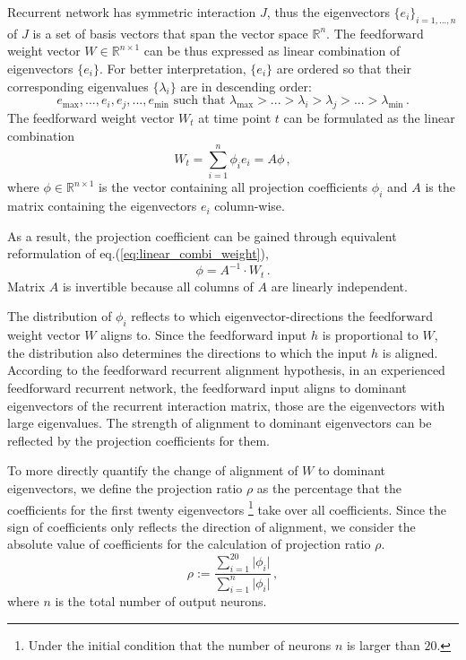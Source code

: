 \documentclass[11pt]{article}
\begin{document}
{	Recurrent network has symmetric interaction $J$, thus the eigenvectors $\{e_i\}_{i = 1, ..., n}$ of $J$ is a set of basis vectors that span the vector space $\mathbb{R}^n$. The feedforward weight vector $W \in \mathbb{R}^{n \times 1}$ can be thus expressed as linear combination of eigenvectors $\{e_i\}$. For better interpretation, $\{e_i\}$ are ordered so that their corresponding eigenvalues $\{\lambda_i\}$ are in descending order:
		\begin{equation}
			e_{\text{max}}, ..., e_i, e_j, ..., e_{\text{min}} \, \, \text{such that} \, \, \lambda_{\text{max}} > ...> \lambda_i > \lambda_j > ... > \lambda_{\text{min}} \, .
		\end{equation} 
	The feedforward weight vector $W_t$ at time point $t$ can be formulated as the linear combination
		\begin{equation} \label{eq:linear_combi_weight}
			W_t = \sum_{i = 1}^{n} \phi_i e_i = A \phi \, ,
		\end{equation}
	where $\phi \in \mathbb{R}^{n \times 1}$ is the vector containing all projection coefficients $\phi_i$ and $A$ is the matrix containing the eigenvectors $e_i$ column-wise.  
	
	As a result, the projection coefficient can be gained through equivalent reformulation of eq.(\ref{eq:linear_combi_weight}), 
		\begin{equation} \label{eq:calculation_ratio}
			\phi = A^{-1} \cdot W_t \, .
		\end{equation}
	Matrix $A$ is invertible because all columns of $A$ are linearly independent. 
	
	The distribution of $\phi_i$ reflects to which eigenvector-directions the feedforward weight vector $W$ aligns to. Since the feedforward input $h$ is proportional to $W$, the distribution also determines the directions to which the input $h$ is aligned.  According to the feedforward recurrent alignment hypothesis, in an experienced feedforward recurrent network, the feedforward input aligns to dominant eigenvectors of the recurrent interaction matrix, those are the eigenvectors with large eigenvalues. The strength of alignment to dominant eigenvectors can be reflected by the projection coefficients for them. 
	
	To more directly quantify the change of alignment of $W$ to dominant eigenvectors, we define the projection ratio $\rho$ as the percentage that the coefficients for the first twenty eigenvectors \footnote{Under the initial condition that the number of neurons $n$ is larger than $20$.} take over all coefficients. Since the sign of coefficients only reflects the direction of alignment, we consider the absolute value of coefficients for the calculation of projection ratio $\rho$.
		\begin{equation} \label{eq:projection_ratio}
			\rho := \frac{\sum_{i=1}^{20} \vert \phi_i \vert}{\sum_{i=1}^{n} \vert \phi_i \vert} \, ,
		\end{equation}
	where $n$ is the total number of output neurons. 
		
}
\end{document}

